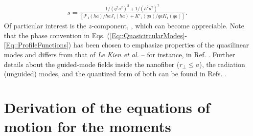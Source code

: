 \documentclass[preprint,aps,pra,onecolumn]{revtex4-1} %
\newcommand{\inp}{{\rm in}}
\begin{document}
\begin{appendix}
	\begin{align}
		s = \frac{1/(q^2 a^2)^{2} + 1/(h^2 a^2)^{2}}{[J'_1(ha)/haJ_1(ha) + K'_1(qa)/qaK_1(qa)]}.
	\end{align}  
Of particular interest is the $z$-component, , which can become appreciable.  Note that the phase convention in Eqs. (\ref{Eq::QuasicircularModes}-\ref{Eq::ProfileFunctions}) has been chosen to emphasize properties of the quasilinear modes and differs from that of \emph{Le Kien et al.} -- for instance, in Ref. \cite{le_kien_propagation_2014}.  Further details about the guided-mode fields inside the nanofiber ($r_\perp\leq a$), the radiation (unguided) modes, and the quantized form of both can be found in Refs. \cite{sondergaard_general_2001, tong_single-mode_2004, kien_field_2004, le_kien_spontaneous_2005, Vetsch thesis}.


\section{Derivation of the equations of motion for the moments} \label{Appendix::OpticalPumping}	

		
			

\end{appendix}
\end{document}
